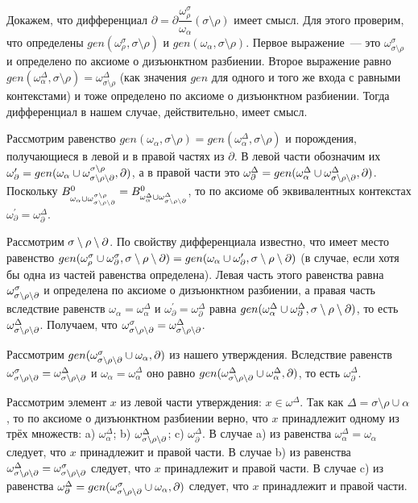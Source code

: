 Докажем, что дифференциал $\partial = \partial\dfrac{\omega^\sigma_\rho}{\omega_\alpha}(\sigma\setminus\rho)$ имеет смысл. Для этого проверим, что определены $gen(\omega^\sigma_\rho, \sigma\setminus\rho)$ и $gen(\omega_\alpha, \sigma\setminus\rho)$. Первое выражение~--- это $\omega^\sigma_{\sigma\setminus\rho}$ и определено по аксиоме о дизъюнктном разбиении. Второе выражение равно $gen(\omega^\Delta_\alpha, \sigma\setminus\rho) = \omega^\Delta_{\sigma\setminus\rho}$ (как значения $gen$ для одного и того же входа с равными контекстами) и тоже определено по аксиоме о дизъюнктном разбиении. Тогда дифференциал в нашем случае, действительно, имеет смысл.

Рассмотрим равенство $gen(\omega_\alpha, \sigma\setminus\rho) = gen(\omega^\Delta_\alpha, \sigma\setminus\rho)$ и порождения, получающиеся в левой и в правой частях из $\partial$. В левой части обозначим их $\omega^\prime_\partial = gen(\omega_\alpha \cup \omega^{\sigma\setminus\rho}_{\sigma\setminus\rho\setminus\partial}, \partial)$, а в правой части это $\omega^\Delta_\partial = gen(\omega^\Delta_\alpha \cup \omega^\Delta_{\sigma\setminus\rho\setminus\partial}, \partial)$. Поскольку $B^0_{\omega_\alpha \cup \omega^{\sigma\setminus\rho}_{\sigma\setminus\rho\setminus\partial}} = B^0_{\omega^\Delta_\alpha \cup \omega^\Delta_{\sigma\setminus\rho\setminus\partial}}$, то по аксиоме об эквивалентных контекстах $\omega^\prime_\partial = \omega^\Delta_\partial$.

Рассмотрим $\sigma\setminus\rho\setminus\partial$. По свойству дифференциала известно, что имеет место равенство $gen(\omega^\sigma_\rho \cup \omega^\sigma_\partial, \sigma\setminus\rho\setminus\partial) = gen(\omega_\alpha \cup \omega^\prime_\partial, \sigma\setminus\rho\setminus\partial)$ (в случае, если хотя бы одна из частей равенства определена). Левая часть этого равенства равна $\omega^\sigma_{\sigma\setminus\rho\setminus\partial}$ и определена по аксиоме о дизъюнктном разбиении, а правая часть вследствие равенств $\omega_\alpha = \omega^\Delta_\alpha$ и $\omega^\prime_\partial = \omega^\Delta_\partial$ равна $gen(\omega^\Delta_\alpha \cup \omega^\Delta_\partial, \sigma\setminus\rho\setminus\partial)$, то есть $\omega^\Delta_{\sigma\setminus\rho\setminus\partial}$. Получаем, что $\omega^\sigma_{\sigma\setminus\rho\setminus\partial} = \omega^\Delta_{\sigma\setminus\rho\setminus\partial}$.

Рассмотрим $gen(\omega^\sigma_{\sigma\setminus\rho\setminus\partial} \cup \omega_\alpha, \partial)$ из нашего утверждения. Вследствие равенств $\omega^\sigma_{\sigma\setminus\rho\setminus\partial} = \omega^\Delta_{\sigma\setminus\rho\setminus\partial}$ и $\omega_\alpha = \omega^\Delta_\alpha$ оно равно $gen(\omega^\Delta_{\sigma\setminus\rho\setminus\partial} \cup \omega^\Delta_\alpha, \partial)$, то есть $\omega^\Delta_\partial$.

Рассмотрим элемент $x$ из левой части утверждения: $x \in \omega^\Delta$. Так как $\Delta = \sigma\setminus\rho\cup\alpha$, то по аксиоме о дизъюнктном разбиении верно, что $x$ принадлежит одному из трёх множеств: a) $\omega^\Delta_\alpha$; b) $\omega^\Delta_{\sigma\setminus\rho\setminus\partial}$; c) $\omega^\Delta_\partial$. В случае a) из равенства $\omega^\Delta_\alpha = \omega_\alpha$ следует, что $x$ принадлежит и правой части. В случае b) из равенства $\omega^\Delta_{\sigma\setminus\rho\setminus\partial} = \omega^\sigma_{\sigma\setminus\rho\setminus\partial}$ следует, что $x$ принадлежит и правой части. В случае c) из равенства $\omega^\Delta_\partial = gen(\omega^\sigma_{\sigma\setminus\rho\setminus\partial} \cup \omega_\alpha, \partial)$ следует, что $x$ принадлежит и правой части.

